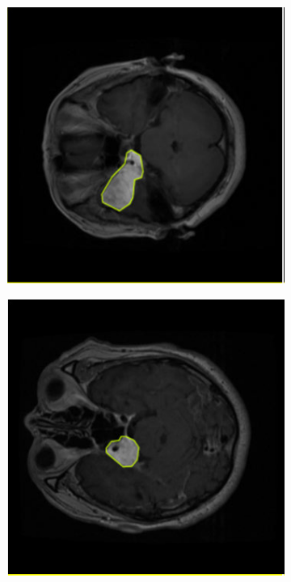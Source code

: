 \documentclass[a4paper,12pt]{extarticle}
\begin{document}
\begin{figure}[H]
    \ContinuedFloat
    \centering
    \begin{subfigure}[b]{0.2\textwidth}
        \centering
        \includegraphics[width=\textwidth]{figure/5.png}
    \end{subfigure}
    \begin{subfigure}[b]{0.2\textwidth}
        \centering
        \includegraphics[width=\textwidth]{figure/6.png}

\end{subfigure}
\end{figure}
\end{document}
